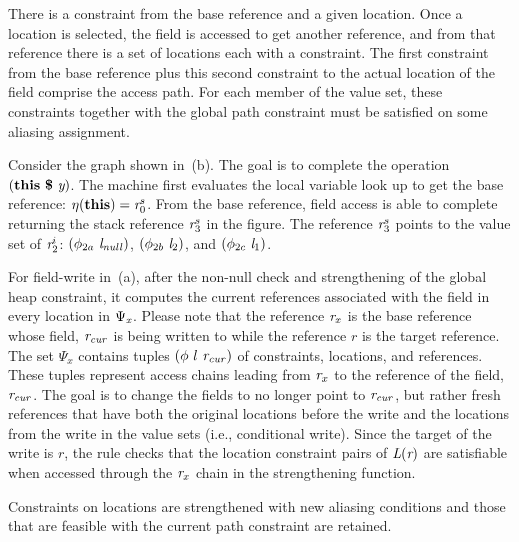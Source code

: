 There is a constraint from the base reference and a given
location. Once a location is selected, the field is accessed to get
another reference, and from that reference there is a set of locations
each with a constraint. The first constraint from the base reference
plus this second constraint to the actual location of the field
comprise the access path. For each member of the value set, these
constraints together with the global path constraint must be satisfied
on some aliasing assignment.

\begin{comment}invoke the summarize rewrite rule
in~\figref{fig:symInit} that performs the initialization of the field
if it points to uninitialized locations. Once the initialization is
complete, we create a new local reference $r^\prime$. An important
property of the references in the bi-partiate graph is that they are
\emph{immutable}. Hence we create a new local reference and assign it
to the initialized reference, and return the local reference. In order
to de-reference a field $r.f$ we define a helper function which is
called the value set.

In the post-condition of the rewrite rule we assign
the value set of input reference $r$ to the local reference $r^\prime$
and return the local reference $r^\prime$ in the next state.
\end{comment}

Consider the graph shown in~(b). The goal is to
complete the operation $\lp\cfgt{this}\ \cfgt{\$}\ \cfgnt{y}\rp$. The
machine first evaluates the local variable look up to get the base
reference: $\eta(\textbf{this}) = \emph{r}^s_0$. From the base
reference, field access is able to complete returning the stack
reference $\emph{r}_3^s$ in the figure. The reference $\emph{r}_3^s$
points to the value set of $\emph{r}_2^i$:
$(\phi_{2a}\ \emph{l}_\mathit{null})$, $(\phi_{2b}\ \emph{l}_2)$,
and $(\phi_{2c}\ \emph{l}_1)$.

For field-write in~(a), after the
non-null check and strengthening of the global heap constraint, it computes the current references associated with the field in every location in $\Psi_{\emph{x}}$. Please note that the reference $\emph{r}_x$ is the base reference
whose field, $\emph{r}_\mathit{cur}$ is being written to while the
reference $r$ is the target reference. The set $\Psi_x$ contains
tuples $(\phi\ l\ \cfgnt{r}_\mathit{cur})$ of constraints, locations, and
references. These tuples represent access chains leading from $\emph{r}_x$ to
the reference of the field, $\emph{r}_\mathit{cur}$. The goal is to change the fields to no longer point to $\emph{r}_\mathit{cur}$, but rather fresh references that have both the original locations before the write and the locations from the write in the value sets (i.e., conditional write). Since the target of the write is $r$, the rule checks that
the location constraint pairs of $\emph{L}(\emph{r})$ are satisfiable when accessed
through the $\emph{r}_x$ chain in the strengthening function.

Constraints on locations are strengthened with new aliasing conditions
and those that are feasible with the current path constraint are
retained. 

